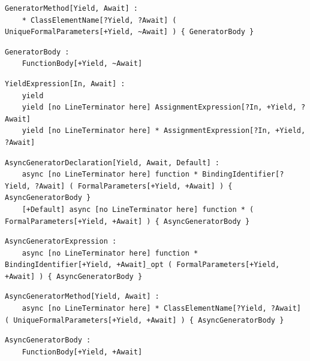 \noindent\textbf{\texttt{}}\par
\begin{lstlisting}
GeneratorMethod[Yield, Await] :
    * ClassElementName[?Yield, ?Await] ( UniqueFormalParameters[+Yield, ~Await] ) { GeneratorBody }
\end{lstlisting}

\noindent\textbf{\texttt{}}\par
\begin{lstlisting}
GeneratorBody :
    FunctionBody[+Yield, ~Await]
\end{lstlisting}

\noindent\textbf{\texttt{}}\par
\begin{lstlisting}
YieldExpression[In, Await] :
    yield
    yield [no LineTerminator here] AssignmentExpression[?In, +Yield, ?Await]
    yield [no LineTerminator here] * AssignmentExpression[?In, +Yield, ?Await]
\end{lstlisting}

\noindent\textbf{\texttt{}}\par
\begin{lstlisting}
AsyncGeneratorDeclaration[Yield, Await, Default] :
    async [no LineTerminator here] function * BindingIdentifier[?Yield, ?Await] ( FormalParameters[+Yield, +Await] ) { AsyncGeneratorBody }
    [+Default] async [no LineTerminator here] function * ( FormalParameters[+Yield, +Await] ) { AsyncGeneratorBody }
\end{lstlisting}

\noindent\textbf{\texttt{}}\par
\begin{lstlisting}
AsyncGeneratorExpression :
    async [no LineTerminator here] function * BindingIdentifier[+Yield, +Await]_opt ( FormalParameters[+Yield, +Await] ) { AsyncGeneratorBody }
\end{lstlisting}

\noindent\textbf{\texttt{}}\par
\begin{lstlisting}
AsyncGeneratorMethod[Yield, Await] :
    async [no LineTerminator here] * ClassElementName[?Yield, ?Await] ( UniqueFormalParameters[+Yield, +Await] ) { AsyncGeneratorBody }
\end{lstlisting}

\noindent\textbf{\texttt{}}\par
\begin{lstlisting}
AsyncGeneratorBody :
    FunctionBody[+Yield, +Await]
\end{lstlisting}

